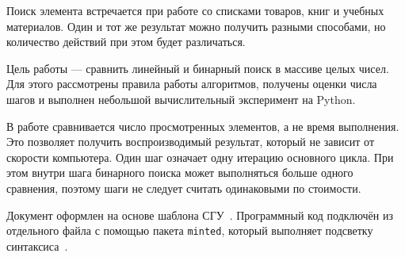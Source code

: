 \intro
Поиск элемента встречается при работе со списками товаров, книг и учебных
материалов. Один и тот же результат можно получить разными способами,
но количество действий при этом будет различаться.

Цель работы --- сравнить линейный и бинарный поиск в массиве целых чисел.
Для этого рассмотрены правила работы алгоритмов, получены оценки числа
шагов и выполнен небольшой вычислительный эксперимент на Python.

В работе сравнивается число просмотренных элементов, а не время выполнения.
Это позволяет получить воспроизводимый результат, который не зависит
от скорости компьютера. Один шаг означает одну итерацию основного цикла.
При этом внутри шага бинарного поиска может выполняться больше одного
сравнения, поэтому шаги не следует считать одинаковыми по стоимости.

Документ оформлен на основе шаблона СГУ~\cite{sgu}.
Программный код подключён из отдельного файла с помощью пакета
\texttt{minted}, который выполняет подсветку синтаксиса~\cite{minted}.
